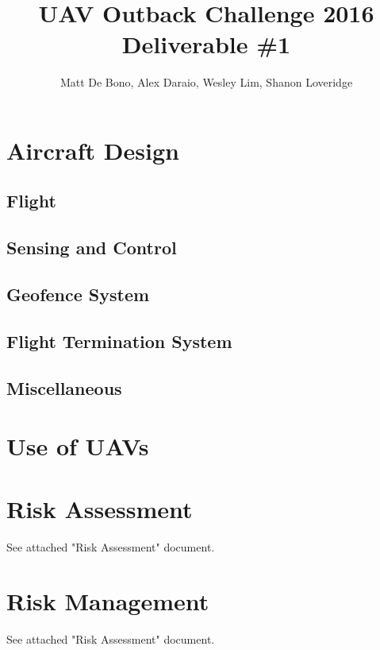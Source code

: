 \documentclass[]{article}
\title{UAV Outback Challenge 2016\\ \large Deliverable \#1\\}
\author{
	Matt De Bono,
	Alex Daraio,
	Wesley Lim,
	Shanon Loveridge}
\begin{document}
\maketitle

\section{Aircraft Design}
\subsection{Flight}


\subsection{Sensing and Control}


\subsection{Geofence System}


\subsection{Flight Termination System}


\subsection{Miscellaneous}


\section{Use of UAVs}


\section{Risk Assessment}
See attached "Risk Assessment" document.

\section{Risk Management}
See attached "Risk Assessment" document.
\end{document}
